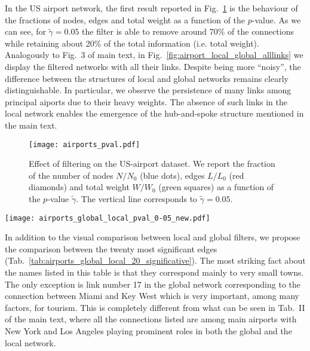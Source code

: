 \documentclass[aps,twocolumn,superscriptaddress]{revtex4-1}
\begin{document}
In the US airport network, the first result reported in Fig.~\ref{fig:airport_filter_pval} is the behaviour of the fractions of nodes, edges and total weight as a function of the $p$-value. As we can see, for $\widetilde{\gamma} = 0.05$ the filter is able to remove around 70\% of the connections while retaining about 20\% of the total information (i.e. total weight). Analogously to Fig.~3 of main text, in Fig.~\ref{fig:airport_local_global_alllinks} we display the filtered networks with all their links. Despite being more ``noisy'', the difference between the structures of local and global networks remains clearly distinguishable. In particular, we observe the persistence of many links among principal aiports due to their heavy weights. The absence of such links in the local network enables the emergence of the hub-and-spoke structure mentioned in the main text.

%
%
%
\begin{figure}[h!]
\centering
%
\texttt{[image: airports\_pval.pdf]}
%
\caption{Effect of filtering on the US-airport dataset. We report the fraction of the number of nodes $N/N_0$ (blue dots), edges $L/L_0$ (red diamonds) and total weight $W/W_0$ (green squares) as a function of the $p$-value $\widetilde{\gamma}$. The vertical line corresponds to $\widetilde{\gamma} = 0.05$.}
\label{fig:airport_filter_pval}
\end{figure}
%


%
%
%
\begin{figure*}[h!]
\centering
%
\texttt{[image: airports\_global\_local\_pval\_0-05\_new.pdf]}
%
\caption{Graphs obtained after filtering according to the global (left) and local (right) ECM method, for the US Airport Network. In the local filter, results refer to $\widetilde{\gamma} = 0.05$; in the global one, we choose the most unlikely links such that the number of edges in the two panels is the same (764).}
\label{fig:airport_local_global_alllinks}
\end{figure*}
%


In addition to the visual comparison between local and global filters, we propose the comparison between the twenty most significant edges (Tab.~\ref{tab:airports_global_local_20_significative}). The most striking fact about the names listed in this table is that they correspond mainly to very small towns. The only exception is link number 17 in the global network corresponding to the connection between Miami and Key West which is very important, among many factors, for tourism. This is completely different from what can be seen in Tab.~II of the main text, where all the connections listed are among main airports with New York and Los Angeles playing prominent roles in both the global and the local network.
\end{document}
